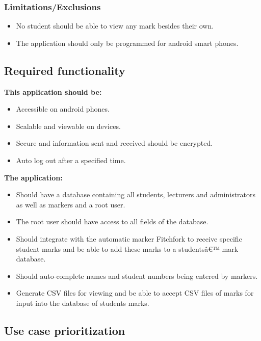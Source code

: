 \documentclass[11pt,a4paper]{article}
\begin{document}
\subsubsection{Limitations/Exclusions}
\begin{itemize}
\item No student should be able to view any mark besides their own.
\item The application should only be programmed for android smart phones.
\end{itemize}
\subsection{Required functionality}
\textbf{This application should be:}

\begin{itemize}
\item Accessible on android phones.
\item Scalable and viewable on devices.
\item Secure and information sent and received should be encrypted.
\item Auto log out after a specified time.
\end{itemize}

\textbf{The application:}
\begin{itemize}
\item Should have a database containing all students, lecturers and administrators as well as markers and a root user.
\item The root user should have access to all fields of the database. 
\item Should integrate with the automatic marker Fitchfork to receive specific student marks and be able to add these marks to a studentsâ€™ mark database.
\item Should auto-complete names and student numbers being entered by markers. 
\item Generate CSV files for viewing and be able to accept CSV files of marks for input into the database of students marks.

\end{itemize}

\subsection{Use case prioritization}
\end{document}
